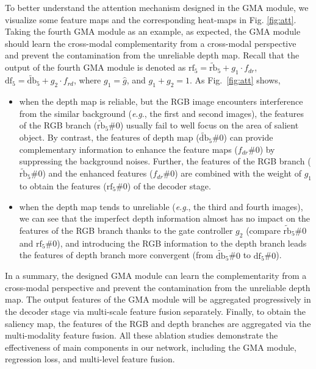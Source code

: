 \documentclass[journal]{IEEEtran}
\newcommand{\eg}{\textit{e}.\textit{g}.}
\begin{document}
To better understand the attention mechanism designed in the GMA module, we visualize some feature maps and the corresponding heat-maps in Fig. \ref{fig:att}.
Taking the fourth GMA module as an example, as expected, the GMA module should learn the cross-modal complementarity from a cross-modal perspective and prevent the contamination from the unreliable depth map. Recall that the output of the fourth GMA module is denoted as $\mathrm{rf}_5= \tilde{\mathrm{rb}}_5 + g_1 \cdot f_{dr}$, $\mathrm{df}_5 = \tilde{\mathrm{db}}_5 + g_2 \cdot f_{rd}$, where $g_1 = \hat{g}$, and $g_1 + g_2 = 1$. As Fig.\ \ref{fig:att} shows,
\begin{itemize}
	\item when the depth map is reliable, but the RGB image encounters interference from the similar background (\eg, the first and second images), the features of the RGB branch ($\tilde{\mathrm{rb}}_5$\#$0$) usually fail to well focus on the area of salient object. By contrast, the features of depth map ($\tilde{\mathrm{db}}_5$\#$0$) can provide complementary information to enhance the feature maps ($f_{dr}$\#$0$) by suppressing the background noises. Further, the features of the RGB branch ($\tilde{\mathrm{rb}}_5$\#$0$) and the enhanced features ($f_{dr}$\#$0$) are combined with the weight of $g_1$ to obtain the features ($\mathrm{rf}_5$\#$0$) of the decoder stage.
	
\item  when the depth map tends to unreliable (\eg, the third and fourth images), we can see that the imperfect depth information almost has no impact on the features of the RGB branch thanks to the gate controller $g_2$ (compare $\tilde{\mathrm{rb}}_5$\#$0$ and $\mathrm{rf}_5$\#$0$), and introducing the RGB information to the depth branch leads the features of depth branch more convergent (from $\tilde{\mathrm{db}}_5$\#$0$ to $\mathrm{df}_5$\#$0$).
\end{itemize}

In a summary, the designed GMA module can learn the complementarity from a cross-modal perspective and prevent the contamination from the unreliable depth map. The output features of the GMA module will be aggregated progressively in the decoder stage via multi-scale feature fusion separately. Finally, to obtain the saliency map, the features of the RGB and depth branches are aggregated via the multi-modality feature fusion. All these ablation studies demonstrate the effectiveness of main components in our network, including the GMA module, regression loss, and multi-level feature fusion.
\end{document}
